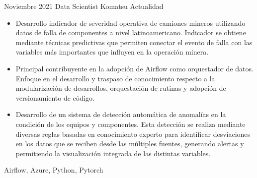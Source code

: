 \begin{experiences}

    \experience
        {Noviembre 2021}
        {Data Scientist}
        {Komatsu}
        {Actualidad}
        {
            \begin{itemize}
            \item Desarrollo indicador de severidad operativa de camiones mineros utilizando datos de falla de componentes a nivel latinoamericano. Indicador se obtiene mediante técnicas predictivas que permiten conectar el evento de falla con las variables más importantes que influyen en la operación minera.
            \item Principal contribuyente en la adopción de Airflow como orquestador de datos. Enfoque en el desarrollo y traspaso de conocimiento respecto a la modularización de desarrollos, orquestación de rutinas y adopción de versionamiento de código.
            \item Desarrollo de un sistema de detección automática de anomalías en la condición de los equipos y componentes. Esta detección se realiza mediante diversas reglas basadas en conocimiento experto para identificar desviaciones en los datos que se reciben desde las múltiples fuentes, generando alertas y permitiendo la visualización integrada de las distintas variables.
            \end{itemize}
        }
        {
            Airflow,
            Azure,
            Python, 
            Pytorch
        }


\end{experiences}

